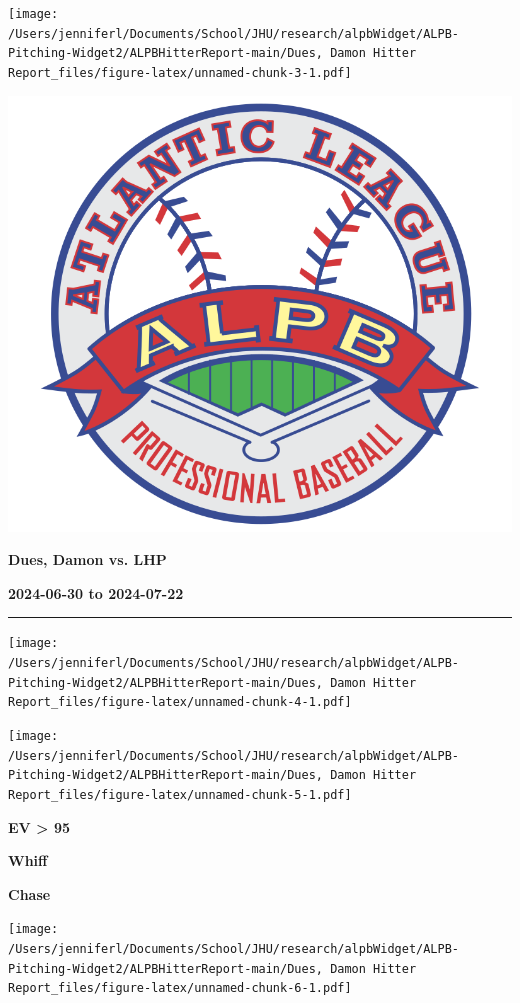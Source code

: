 \documentclass[
]{article}
\begin{document}
\texttt{[image: /Users/jenniferl/Documents/School/JHU/research/alpbWidget/ALPB-Pitching-Widget2/ALPBHitterReport-main/Dues, Damon Hitter Report\_files/figure-latex/unnamed-chunk-3-1.pdf]}

\newpage
\begin{multicols}{3}

\includegraphics[width=0.4\columnwidth]{ALPB_Logo}

\hspace{0pt}
\vfill
\hspace{-0.5in}\large\textbf{Dues, Damon vs. LHP}
\vfill
\hspace{0pt}

\hspace{0pt}
\vfill
\large\textbf{2024-06-30 to 2024-07-22}
\vfill
\hspace{0pt}

\end{multicols}
\vspace{-0.35in}

\noindent

\rule{\textwidth}{0.75pt}

\texttt{[image: /Users/jenniferl/Documents/School/JHU/research/alpbWidget/ALPB-Pitching-Widget2/ALPBHitterReport-main/Dues, Damon Hitter Report\_files/figure-latex/unnamed-chunk-4-1.pdf]}

\texttt{[image: /Users/jenniferl/Documents/School/JHU/research/alpbWidget/ALPB-Pitching-Widget2/ALPBHitterReport-main/Dues, Damon Hitter Report\_files/figure-latex/unnamed-chunk-5-1.pdf]}

\begin{multicols}{3}



\hspace{0.2in}\centerline{\LARGE\textbf{EV > 95}}



\hspace{-0.05in}\centerline{\LARGE\textbf{Whiff}}



\hspace{-0.05in}\centerline{\LARGE\textbf{Chase}}
\end{multicols}

\texttt{[image: /Users/jenniferl/Documents/School/JHU/research/alpbWidget/ALPB-Pitching-Widget2/ALPBHitterReport-main/Dues, Damon Hitter Report\_files/figure-latex/unnamed-chunk-6-1.pdf]}
\end{document}
